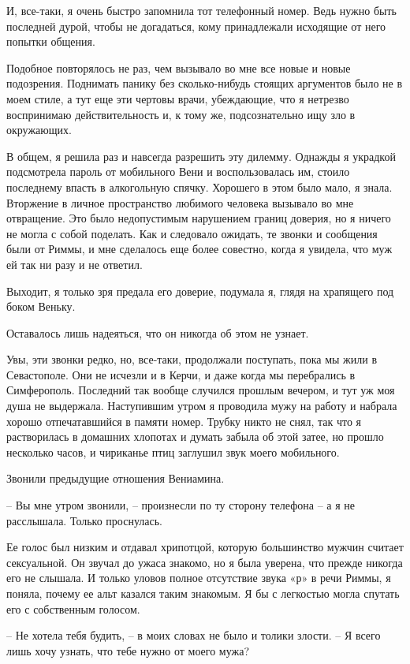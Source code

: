 \documentclass[
]{book}
\begin{document}
И, все-таки, я очень быстро запомнила тот телефонный номер. Ведь нужно быть последней дурой, чтобы не догадаться, кому принадлежали исходящие от него попытки общения.

Подобное повторялось не раз, чем вызывало во мне все новые и новые подозрения. Поднимать панику без сколько-нибудь стоящих аргументов было не в моем стиле, а тут еще эти чертовы врачи, убеждающие, что я нетрезво воспринимаю действительность и, к тому же, подсознательно ищу зло в окружающих.

В общем, я решила раз и навсегда разрешить эту дилемму. Однажды я украдкой подсмотрела пароль от мобильного Вени и воспользовалась им, стоило последнему впасть в алкогольную спячку. Хорошего в этом было мало, я знала. Вторжение в личное пространство любимого человека вызывало во мне отвращение. Это было недопустимым нарушением границ доверия, но я ничего не могла с собой поделать. Как и следовало ожидать, те звонки и сообщения были от Риммы, и мне сделалось еще более совестно, когда я увидела, что муж ей так ни разу и не ответил.

Выходит, я только зря предала его доверие, подумала я, глядя на храпящего под боком Веньку.

Оставалось лишь надеяться, что он никогда об этом не узнает.

Увы, эти звонки редко, но, все-таки, продолжали поступать, пока мы жили в Севастополе. Они не исчезли и в Керчи, и даже когда мы перебрались в Симферополь. Последний так вообще случился прошлым вечером, и тут уж моя душа не выдержала. Наступившим утром я проводила мужу на работу и набрала хорошо отпечатавшийся в памяти номер. Трубку никто не снял, так что я растворилась в домашних хлопотах и думать забыла об этой затее, но прошло несколько часов, и чириканье птиц заглушил звук моего мобильного.

Звонили предыдущие отношения Вениамина.

-- Вы мне утром звонили, -- произнесли по ту сторону телефона -- а я не расслышала. Только проснулась.

Ее голос был низким и отдавал хрипотцой, которую большинство мужчин считает сексуальной. Он звучал до ужаса знакомо, но я была уверена, что прежде никогда его не слышала. И только уловов полное отсутствие звука «р» в речи Риммы, я поняла, почему ее альт казался таким знакомым. Я бы с легкостью могла спутать его с собственным голосом.

-- Не хотела тебя будить, -- в моих словах не было и толики злости. -- Я всего лишь хочу узнать, что тебе нужно от моего мужа?
\end{document}
